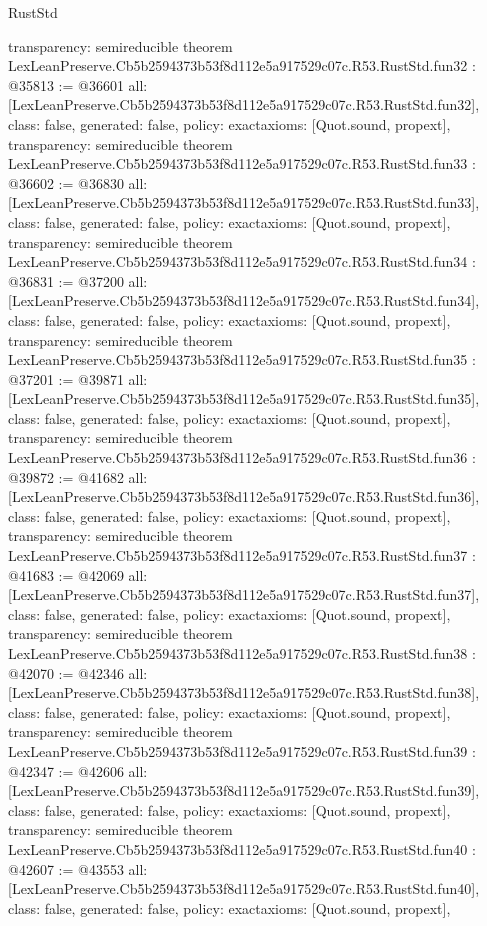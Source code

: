 \begin{lexlean}{RustStd}
\begin{coremodule}
{  transparency: semireducible
}
theorem LexLeanPreserve.Cb5b2594373b53f8d112e5a917529c07c.R53.RustStd.fun32 : @35813 := @36601 {
  all: [LexLeanPreserve.Cb5b2594373b53f8d112e5a917529c07c.R53.RustStd.fun32],
  class: false,
  generated: false,
  policy: exact{axioms: [Quot.sound, propext]},
  transparency: semireducible
}
theorem LexLeanPreserve.Cb5b2594373b53f8d112e5a917529c07c.R53.RustStd.fun33 : @36602 := @36830 {
  all: [LexLeanPreserve.Cb5b2594373b53f8d112e5a917529c07c.R53.RustStd.fun33],
  class: false,
  generated: false,
  policy: exact{axioms: [Quot.sound, propext]},
  transparency: semireducible
}
theorem LexLeanPreserve.Cb5b2594373b53f8d112e5a917529c07c.R53.RustStd.fun34 : @36831 := @37200 {
  all: [LexLeanPreserve.Cb5b2594373b53f8d112e5a917529c07c.R53.RustStd.fun34],
  class: false,
  generated: false,
  policy: exact{axioms: [Quot.sound, propext]},
  transparency: semireducible
}
theorem LexLeanPreserve.Cb5b2594373b53f8d112e5a917529c07c.R53.RustStd.fun35 : @37201 := @39871 {
  all: [LexLeanPreserve.Cb5b2594373b53f8d112e5a917529c07c.R53.RustStd.fun35],
  class: false,
  generated: false,
  policy: exact{axioms: [Quot.sound, propext]},
  transparency: semireducible
}
theorem LexLeanPreserve.Cb5b2594373b53f8d112e5a917529c07c.R53.RustStd.fun36 : @39872 := @41682 {
  all: [LexLeanPreserve.Cb5b2594373b53f8d112e5a917529c07c.R53.RustStd.fun36],
  class: false,
  generated: false,
  policy: exact{axioms: [Quot.sound, propext]},
  transparency: semireducible
}
theorem LexLeanPreserve.Cb5b2594373b53f8d112e5a917529c07c.R53.RustStd.fun37 : @41683 := @42069 {
  all: [LexLeanPreserve.Cb5b2594373b53f8d112e5a917529c07c.R53.RustStd.fun37],
  class: false,
  generated: false,
  policy: exact{axioms: [Quot.sound, propext]},
  transparency: semireducible
}
theorem LexLeanPreserve.Cb5b2594373b53f8d112e5a917529c07c.R53.RustStd.fun38 : @42070 := @42346 {
  all: [LexLeanPreserve.Cb5b2594373b53f8d112e5a917529c07c.R53.RustStd.fun38],
  class: false,
  generated: false,
  policy: exact{axioms: [Quot.sound, propext]},
  transparency: semireducible
}
theorem LexLeanPreserve.Cb5b2594373b53f8d112e5a917529c07c.R53.RustStd.fun39 : @42347 := @42606 {
  all: [LexLeanPreserve.Cb5b2594373b53f8d112e5a917529c07c.R53.RustStd.fun39],
  class: false,
  generated: false,
  policy: exact{axioms: [Quot.sound, propext]},
  transparency: semireducible
}
theorem LexLeanPreserve.Cb5b2594373b53f8d112e5a917529c07c.R53.RustStd.fun40 : @42607 := @43553 {
  all: [LexLeanPreserve.Cb5b2594373b53f8d112e5a917529c07c.R53.RustStd.fun40],
  class: false,
  generated: false,
  policy: exact{axioms: [Quot.sound, propext]},
}
\end{coremodule}
\end{lexlean}
